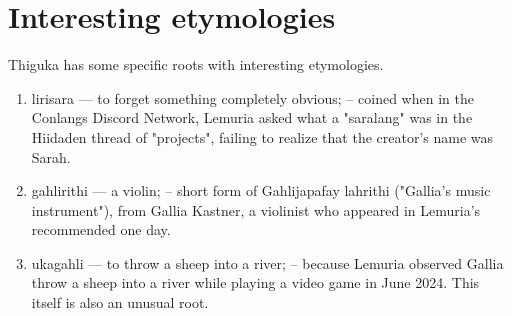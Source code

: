 \section{Interesting etymologies}
Thiguka has some specific roots with interesting etymologies.

\begin{enumerate}
    \item lirisara --- to forget something completely obvious; -- coined when in the Conlangs Discord Network, Lemuria asked what a "saralang" was in the Hiidaden thread of "projects", failing to realize that the creator's name was Sarah.
    \item gahlirithi --- a violin; -- short form of Gahlijapafay lahrithi ("Gallia's music instrument"), from Gallia Kastner, a violinist who appeared in Lemuria's recommended one day.
    \item ukagahli --- to throw a sheep into a river; -- because Lemuria observed Gallia throw a sheep into a river while playing a video game in June 2024. This itself is also an unusual root.
\end{enumerate}
